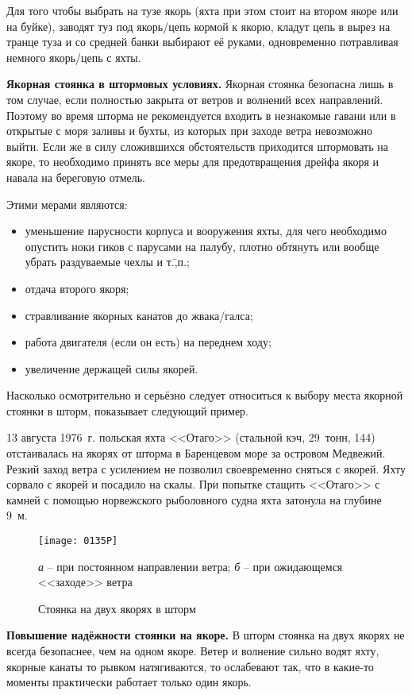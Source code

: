 Для того чтобы выбрать на тузе якорь (яхта при этом стоит на втором
якоре или на буйке), заводят туз под якорь\-/цепь кормой к якорю,
кладут цепь в вырез на транце туза и со средней банки выбирают её
руками, одновременно потравливая немного якорь\-/цепь с яхты.

\textbf{Якорная стоянка в штормовых условиях.} Якорная стоянка
безопасна лишь в том случае, если полностью закрыта от ветров и
волнений всех направлений. Поэтому во время шторма не рекомендуется
входить в незнакомые гавани или в открытые с моря заливы и бухты, из
которых при заходе ветра невозможно выйти. Если же в силу сложившихся
обстоятельств приходится штормовать на якоре, то необходимо принять
все меры для предотвращения дрейфа якоря и навала на береговую отмель.

Этими мерами являются: 
\begin{itemize}
\item уменьшение парусности корпуса и вооружения яхты, для чего
  необходимо опустить ноки гиков с парусами на палубу, плотно обтянуть
  или вообще убрать раздуваемые чехлы и т.\=,п.;
\item отдача второго якоря; 
\item стравливание якорных канатов до жвака\-/галса; 
\item работа двигателя (если он есть) на переднем ходу; 
\item увеличение держащей силы якорей. 
\end{itemize}

Насколько осмотрительно и серьёзно следует относиться к выбору места
якорной стоянки в шторм, показывает следующий пример.

{\small 13 августа 1976~г. польская яхта <<Отаго>> (стальной кэч,
  29~тонн, 144\msq) отстаивалась на якорях от шторма в Баренцевом море
  за островом Медвежий. Резкий заход ветра с усилением не позволил
  своевременно сняться с якорей. Яхту сорвало с якорей и посадило на
  скалы. При попытке стащить <<Отаго>> с камней с помощью норвежского
  рыболовного судна яхта затонула на глубине 9~м.}

\begin{figure}[!htb]
  \centering{}
  \texttt{[image: 0135P]}
  \caption{Стоянка на двух якорях в шторм}
  \label{fig:135}
  \small
  \centering{}
  \textit{а} \--- при постоянном направлении ветра; \textit{б} \--- при ожидающемся <<заходе>> ветра
\end{figure}

\textbf{Повышение надёжности стоянки на якоре.} В шторм стоянка на
двух якорях не всегда безопаснее, чем на одном якоре. Ветер и волнение
сильно водят яхту, якорные канаты то рывком натягиваются, то
ослабевают так, что в какие-то моменты практически работает только
один якорь.

